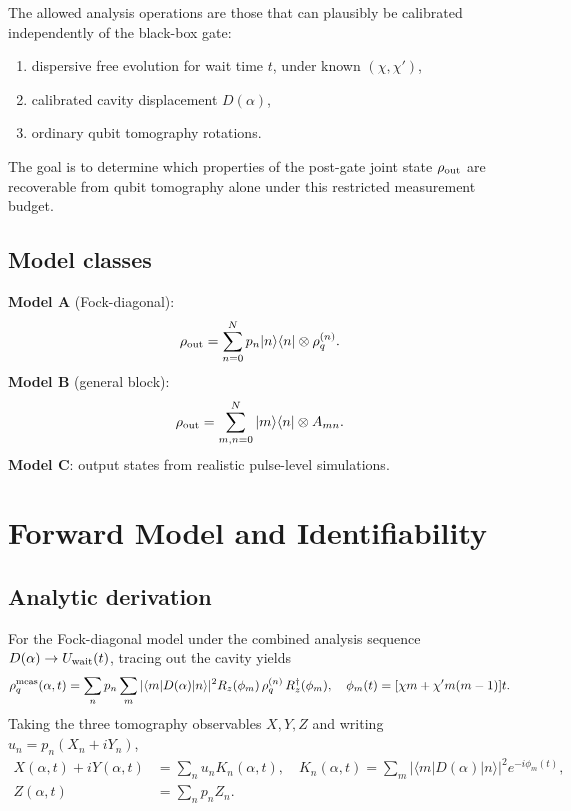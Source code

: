 \documentclass[11pt,onecolumn]{article}
\begin{document}
The allowed analysis operations are those that can plausibly be calibrated
independently of the black-box gate:
\begin{enumerate}
\item dispersive free evolution for wait time $t$, under known $(\chi,\chi')$,
\item calibrated cavity displacement $D(\alpha)$,
\item ordinary qubit tomography rotations.
\end{enumerate}

The goal is to determine which properties of the post-gate joint state
$\rho_{\rm out}$ are recoverable from qubit tomography alone under this
restricted measurement budget.

\subsection*{Model classes}
\textbf{Model A} (Fock-diagonal):
\begin{equation}
\rho_{\rm out}=\sum_{n=0}^{N}p_n|n\rangle\langle n|\otimes\rho_q^{(n)}.
\end{equation}
\textbf{Model B} (general block):
\begin{equation}
\rho_{\rm out}=\sum_{m,n=0}^{N}|m\rangle\langle n|\otimes A_{mn}.
\end{equation}
\textbf{Model C}: output states from realistic pulse-level simulations.

\section{Forward Model and Identifiability}

\subsection{Analytic derivation}

For the Fock-diagonal model under the combined analysis sequence
$D(\alpha)\to U_{\rm wait}(t)$, tracing out the cavity yields
\begin{equation}
\label{eq:forward}
\rho_q^{\rm meas}(\alpha,t)=\sum_{n}p_n\sum_{m}|\langle m|D(\alpha)|n\rangle|^2
R_z(\phi_m)\,\rho_q^{(n)}\,R_z^\dagger(\phi_m),\quad
\phi_m(t)=[\chi m+\chi'm(m-1)]t.
\end{equation}
Taking the three tomography observables $X,Y,Z$ and writing $u_n=p_n(X_n+iY_n)$,
\begin{align}
\label{eq:kernel}
X(\alpha,t)+iY(\alpha,t)&=\sum_n u_n K_n(\alpha,t),\quad
K_n(\alpha,t)=\sum_m|\langle m|D(\alpha)|n\rangle|^2 e^{-i\phi_m(t)},\\
Z(\alpha,t)&=\sum_n p_n Z_n.
\end{align}
\end{document}
